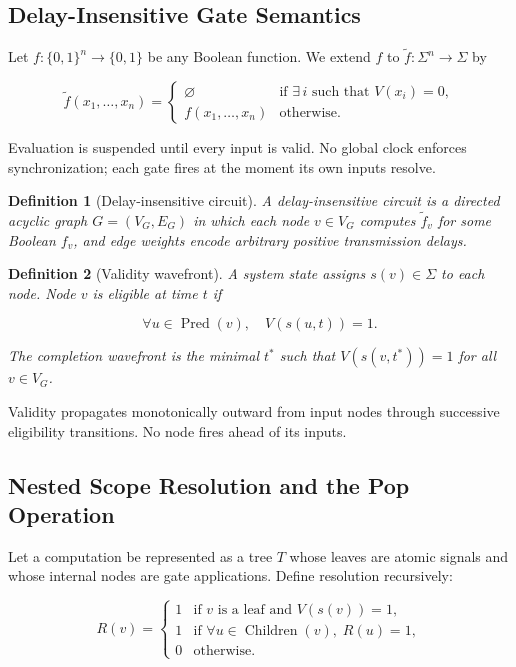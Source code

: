 \documentclass[11pt]{article}
\newtheorem{definition}{Definition}
\theoremstyle{remark}
\begin{document}
\subsection{Delay-Insensitive Gate Semantics}

Let $f : \{0,1\}^n \to \{0,1\}$ be any Boolean function. We extend $f$ to $\tilde{f} : \Sigma^n \to \Sigma$ by

\[
\tilde{f}(x_1, \dots, x_n) = \begin{cases} \varnothing & \text{if } \exists\, i \text{ such that } V(x_i) = 0, \\ f(x_1, \dots, x_n) & \text{otherwise.} \end{cases}
\]

Evaluation is suspended until every input is valid. No global clock enforces synchronization; each gate fires at the moment its own inputs resolve.

\begin{definition}[Delay-insensitive circuit]
A delay-insensitive circuit is a directed acyclic graph $G = (V_G, E_G)$ in which each node $v \in V_G$ computes $\tilde{f}_v$ for some Boolean $f_v$, and edge weights encode arbitrary positive transmission delays.
\end{definition}

\begin{definition}[Validity wavefront]
A system state assigns $s(v) \in \Sigma$ to each node. Node $v$ is \emph{eligible} at time $t$ if

\[
\forall u \in \operatorname{Pred}(v),\quad V(s(u,t)) = 1.
\]

The \emph{completion wavefront} is the minimal $t^*$ such that $V(s(v, t^*)) = 1$ for all $v \in V_G$.
\end{definition}

Validity propagates monotonically outward from input nodes through successive eligibility transitions. No node fires ahead of its inputs.

\subsection{Nested Scope Resolution and the Pop Operation}

Let a computation be represented as a tree $T$ whose leaves are atomic signals and whose internal nodes are gate applications. Define resolution recursively:

\[
R(v) = \begin{cases} 1 & \text{if } v \text{ is a leaf and } V(s(v)) = 1, \\ 1 & \text{if } \forall u \in \operatorname{Children}(v),\; R(u) = 1, \\ 0 & \text{otherwise.} \end{cases}
\]
\end{document}

